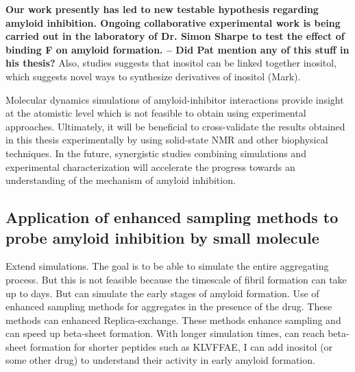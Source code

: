 \textbf{Our work presently has led to new testable hypothesis regarding amyloid inhibition. Ongoing collaborative experimental work is being carried out in the laboratory of Dr. Simon Sharpe to test the effect of binding F on amyloid formation. -- Did Pat mention any of this stuff in his thesis?} Also, studies suggests that inositol can be linked together inositol, which suggests novel ways to synthesize derivatives of inositol (Mark).

Molecular dynamics simulations of amyloid-inhibitor interactions provide insight at the atomistic level which is not feasible to obtain using experimental approaches.  Ultimately, it will be beneficial to cross-validate the results obtained in this thesis experimentally by using solid-state NMR and other biophysical techniques. In the future, synergistic studies combining simulations and experimental characterization will accelerate the progress towards an understanding of the mechanism of amyloid inhibition.   
 





\subsection{Application of enhanced sampling methods to probe amyloid inhibition by small molecule}
Extend simulations. The goal is to be able to simulate the entire aggregating process.  But this is not feasible because the timescale of fibril formation can take up to days. But can simulate the early stages of amyloid formation.  Use of enhanced sampling methods for aggregates in the presence of the drug.  These methods can enhanced Replica-exchange.  These methods enhance sampling and can speed up beta-sheet formation. With longer simulation times, can reach beta-sheet formation for shorter peptides such as KLVFFAE, I can add inositol (or some other drug) to understand their activity in early amyloid formation.

